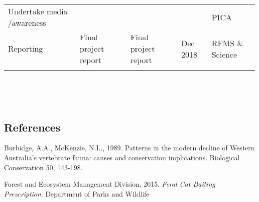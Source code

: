 \documentclass[version=last,
    paper=a4,                               %
    10pt,                                   %
    dvipsnames,
    oneside,                              %
    headings=openany,                       %
    open=any,
    BCOR=7mm,                               %
    DIV=15,     %
]{scrbook}
\begin{document}
\begin{longtable}[c]{@{}lllll@{}}
\\\addlinespace
\begin{minipage}[t]{0.17\columnwidth}\raggedright
Undertake media /awareness
\end{minipage} & \begin{minipage}[t]{0.17\columnwidth}\raggedright
~
\end{minipage} & \begin{minipage}[t]{0.17\columnwidth}\raggedright
~
\end{minipage} & \begin{minipage}[t]{0.17\columnwidth}\raggedright
~
\end{minipage} & \begin{minipage}[t]{0.17\columnwidth}\raggedright
PICA~
\end{minipage}
\\\addlinespace
\begin{minipage}[t]{0.17\columnwidth}\raggedright
Reporting
\end{minipage} & \begin{minipage}[t]{0.17\columnwidth}\raggedright
Final project report
\end{minipage} & \begin{minipage}[t]{0.17\columnwidth}\raggedright
Final project report
\end{minipage} & \begin{minipage}[t]{0.17\columnwidth}\raggedright
Dec 2018
\end{minipage} & \begin{minipage}[t]{0.17\columnwidth}\raggedright
RFMS \& Science
\end{minipage}
\\\addlinespace
\bottomrule
\end{longtable}

~~

~




\subsection*{References}

Burbidge, A.A., McKenzie, N.L., 1989. Patterns in the modern decline of
Western Australia's vertebrate fauna: causes and conservation
implications. Biological Conservation 50, 143-198.

Forest and Ecosystem Management Division, 2015. \emph{Feral Cat Baiting
Prescription}. Department of Parks and Wildlife
\end{document}
